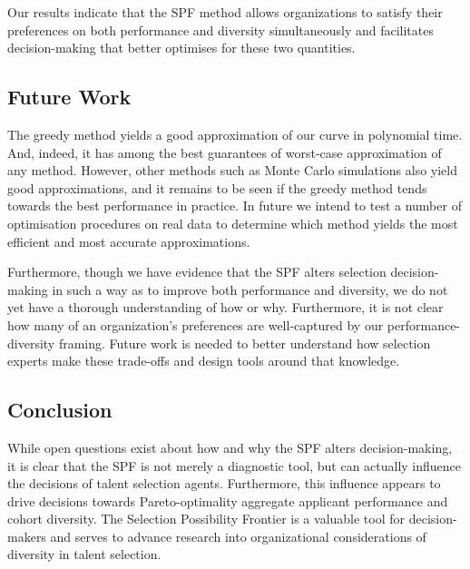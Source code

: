 Our results indicate that the SPF method allows organizations to satisfy their preferences on both performance and diversity simultaneously and facilitates decision-making that better optimises for these two quantities.

\subsection{Future Work}
The greedy method yields a good approximation of our curve in polynomial time. And, indeed, it has among the best guarantees of worst-case approximation of any method. However, other methods such as Monte Carlo simulations also yield good approximations, and it remains to be seen if the greedy method tends towards the best performance in practice. In future we intend to test a number of optimisation procedures on real data to determine which method yields the most efficient and most accurate approximations.

Furthermore, though we have evidence that the SPF alters selection decision-making in such a way as to improve both performance and diversity, we do not yet have a thorough understanding of how or why. Furthermore, it is not clear how many of an organization's preferences are well-captured by our performance-diversity framing. Future work is needed to better understand how selection experts make these trade-offs and design tools around that knowledge.

\subsection{Conclusion}
While open questions exist about how and why the SPF alters decision-making, it is clear that the SPF is not merely a diagnostic tool, but can actually influence the decisions of talent selection agents. Furthermore, this influence appears to drive decisions towards Pareto-optimality aggregate applicant performance and cohort diversity. The Selection Possibility Frontier is a valuable tool for decision-makers and serves to advance research into organizational considerations of diversity in talent selection.